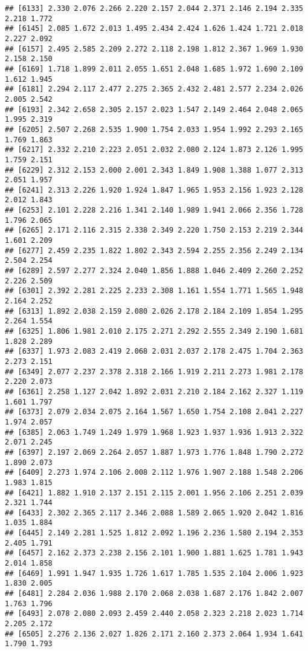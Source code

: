 \documentclass[
]{article}
\begin{document}
\begin{verbatim}
## [6133] 2.330 2.076 2.266 2.220 2.157 2.044 2.371 2.146 2.194 2.335 2.218 1.772
## [6145] 2.085 1.672 2.013 1.495 2.434 2.424 1.626 1.424 1.721 2.018 2.227 2.092
## [6157] 2.495 2.585 2.209 2.272 2.118 2.198 1.812 2.367 1.969 1.930 2.158 2.150
## [6169] 1.718 1.899 2.011 2.055 1.651 2.048 1.685 1.972 1.690 2.109 1.612 1.945
## [6181] 2.294 2.117 2.477 2.275 2.365 2.432 2.481 2.577 2.234 2.026 2.005 2.542
## [6193] 2.342 2.658 2.305 2.157 2.023 1.547 2.149 2.464 2.048 2.065 1.995 2.319
## [6205] 2.507 2.268 2.535 1.900 1.754 2.033 1.954 1.992 2.293 2.165 1.769 1.863
## [6217] 2.332 2.210 2.223 2.051 2.032 2.080 2.124 1.873 2.126 1.995 1.759 2.151
## [6229] 2.312 2.153 2.000 2.001 2.343 1.849 1.908 1.388 1.077 2.313 2.051 1.957
## [6241] 2.313 2.226 1.920 1.924 1.847 1.965 1.953 2.156 1.923 2.128 2.012 1.843
## [6253] 2.101 2.228 2.216 1.341 2.140 1.989 1.941 2.066 2.356 1.728 1.796 2.065
## [6265] 2.171 2.116 2.315 2.338 2.349 2.220 1.750 2.153 2.219 2.344 1.601 2.209
## [6277] 2.459 2.235 1.822 1.802 2.343 2.594 2.255 2.356 2.249 2.134 2.504 2.254
## [6289] 2.597 2.277 2.324 2.040 1.856 1.888 1.046 2.409 2.260 2.252 2.226 2.509
## [6301] 2.392 2.281 2.225 2.233 2.308 1.161 1.554 1.771 1.565 1.948 2.164 2.252
## [6313] 1.892 2.038 2.159 2.080 2.026 2.178 2.184 2.109 1.854 1.295 2.264 1.554
## [6325] 1.806 1.981 2.010 2.175 2.271 2.292 2.555 2.349 2.190 1.681 1.828 2.289
## [6337] 1.973 2.083 2.419 2.068 2.031 2.037 2.178 2.475 1.704 2.363 2.273 2.151
## [6349] 2.077 2.237 2.378 2.318 2.166 1.919 2.211 2.273 1.981 2.178 2.220 2.073
## [6361] 2.258 1.127 2.042 1.892 2.031 2.210 2.184 2.162 2.327 1.119 1.601 1.797
## [6373] 2.079 2.034 2.075 2.164 1.567 1.650 1.754 2.108 2.041 2.227 1.974 2.057
## [6385] 2.063 1.749 1.249 1.979 1.968 1.923 1.937 1.936 1.913 2.322 2.071 2.245
## [6397] 2.197 2.069 2.264 2.057 1.887 1.973 1.776 1.848 1.790 2.272 1.890 2.073
## [6409] 2.273 1.974 2.106 2.008 2.112 1.976 1.907 2.188 1.548 2.206 1.983 1.815
## [6421] 1.882 1.910 2.137 2.151 2.115 2.001 1.956 2.106 2.251 2.039 2.321 1.744
## [6433] 2.302 2.365 2.117 2.346 2.088 1.589 2.065 1.920 2.042 1.816 1.035 1.884
## [6445] 2.149 2.281 1.525 1.812 2.092 1.196 2.236 1.580 2.194 2.353 2.405 1.791
## [6457] 2.162 2.373 2.238 2.156 2.101 1.900 1.881 1.625 1.781 1.943 2.014 1.858
## [6469] 1.991 1.947 1.935 1.726 1.617 1.785 1.535 2.104 2.006 1.923 1.830 2.005
## [6481] 2.284 2.036 1.988 2.170 2.068 2.038 1.687 2.176 1.842 2.007 1.763 1.796
## [6493] 2.078 2.080 2.093 2.459 2.440 2.058 2.323 2.218 2.023 1.714 2.205 2.172
## [6505] 2.276 2.136 2.027 1.826 2.171 2.160 2.373 2.064 1.934 1.641 1.790 1.793

\end{verbatim}
\end{document}
